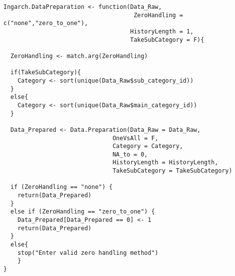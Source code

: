 \begin{verbatim}
Ingarch.DataPreparation <- function(Data_Raw,
                                     ZeroHandling = c("none","zero_to_one"),
                                    HistoryLength = 1,
                                    TakeSubCategory = F){
  
  ZeroHandling <- match.arg(ZeroHandling)
  
  if(TakeSubCategory){
    Category <- sort(unique(Data_Raw$sub_category_id))
  }
  else{
    Category <- sort(unique(Data_Raw$main_category_id))
  }
  
  Data_Prepared <- Data.Preparation(Data_Raw = Data_Raw,
                               OneVsAll = F,
                               Category = Category,
                               NA_to = 0,
                               HistoryLength = HistoryLength,
                               TakeSubCategory = TakeSubCategory)
  
  if (ZeroHandling == "none") {
    return(Data_Prepared)
  }
  else if (ZeroHandling == "zero_to_one") {
    Data_Prepared[Data_Prepared == 0] <- 1
    return(Data_Prepared)
  }
  else{
    stop("Enter valid zero handling method")
    }
}
\end{verbatim}

